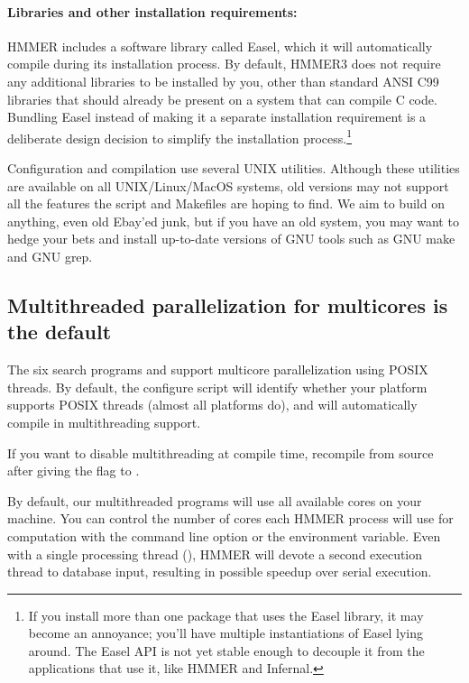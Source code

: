 \paragraph{Libraries and other installation requirements:} HMMER includes
a software library called Easel, which it will automatically compile
during its installation process.  By default, HMMER3 does not require
any additional libraries to be installed by you, other than standard
ANSI C99 libraries that should already be present on a system that can
compile C code. Bundling Easel instead of making it a separate
installation requirement is a deliberate design decision to simplify
the installation process.\footnote{If you install more than one
  package that uses the Easel library, it may become an annoyance;
  you'll have multiple instantiations of Easel lying around. The Easel
  API is not yet stable enough to decouple it from the applications
  that use it, like HMMER and Infernal.}

Configuration and compilation use several UNIX utilities. Although
these utilities are available on all UNIX/Linux/MacOS systems, old
versions may not support all the features the 
script and Makefiles are hoping to find. We aim to build on anything,
even old Ebay'ed junk, but if you have an old system, you may want to
hedge your bets and install up-to-date versions of GNU tools such as
GNU make and GNU grep.


\subsection{Multithreaded parallelization for multicores is the default}

The six search programs and  support multicore
parallelization using POSIX threads. By default, the configure script
will identify whether your platform supports POSIX threads (almost all
platforms do), and will automatically compile in multithreading
support.

If you want to disable multithreading at compile time, recompile from
source after giving the  flag to
.

By default, our multithreaded programs will use all available cores on
your machine. You can control the number of cores each HMMER process
will use for computation with the  command line
option or the  environment variable. Even with a
single processing thread (), HMMER will devote a second
execution thread to database input, resulting in possible speedup
over serial execution.


